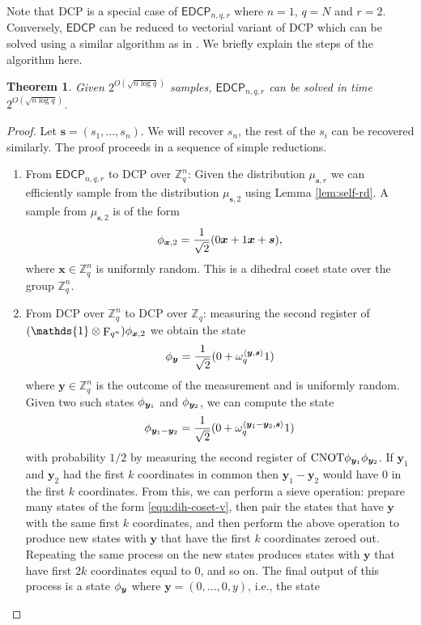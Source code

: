 \documentclass[11pt]{article}
\theoremstyle{plain}
\newtheorem{theorem}{Theorem}
\theoremstyle{definition}
\DeclareMathOperator{\qft}{F}
\let\ket\relax
\DeclarePairedDelimiter{\ket}{\lvert}{\rangle}
\DeclarePairedDelimiter{\lrang}{\langle}{\rangle}
\def\Z{\mathbb{Z}}
\def\edcp{\mathsf{EDCP}}
\begin{document}
Note that DCP is a special case of $\edcp_{n, q, r}$ where $n = 1$, $q = N$ and $r = 2$. Conversely, $\edcp$ can be reduced to vectorial variant of DCP which can be solved using a similar algorithm as in \cite{kuperberg2005subexponential}. We briefly explain the steps of the algorithm here.
\begin{theorem}
    \label{thm:subexp-smpl}
    Given $2^{O(\sqrt{n\log q})}$ samples, $\edcp_{n, q, r}$ can be solved in time $2^{O(\sqrt{n\log q})}$.
\end{theorem}
\begin{proof}
    Let $\bm{s} = (s_1, \dots, s_n)$. We will recover $s_n$, the rest of the $s_i$ can be recovered similarly. The proof proceeds in a sequence of simple reductions.
    \begin{enumerate}[leftmargin = *, font = \bfseries]
    \item From $\edcp_{n, q, r}$ to DCP over $\Z_q^n$: Given the distribution $\mu_{\bm{s}, r}$ we can efficiently sample from the distribution $\mu_{\bm{s}, 2}$ using Lemma \ref{lem:self-rd}. A sample from $\mu_{\bm{s}, 2}$ is of the form
    \[ \ket{\phi_{\bm{x}, 2}} = \frac{1}{\sqrt{2}}(\ket{0}\ket{\bm{x}} + \ket{1}\ket{\bm{x} + \bm{s}}), \]
    where $\bm{x} \in \Z_q^n$ is uniformly random. This is a dihedral coset state over the group $\Z_q^n$.
    \item From DCP over $\Z_q^n$ to DCP over $\Z_q$: measuring the second register of $(\mathds{1} \otimes \qft_{q^n}) \ket{\phi_{\bm{x}, 2}}$ we obtain the state
    \begin{equation}
        \label{equ:dih-coset-v}
        \ket{\phi_{\bm{y}}} = \frac{1}{\sqrt{2}}(\ket{0} + \omega_q^{\lrang{\bm{y}, \bm{s}}}\ket{1})
    \end{equation}
    where $\bm{y} \in \Z_q^n$ is the outcome of the measurement and is uniformly random. Given two such states $\ket{\phi_{\bm{y}_1}}$ and $\ket{\phi_{\bm{y}_2}}$, we can compute the state
    \[ \ket{\phi_{\bm{y}_1 - \bm{y}_2}} = \frac{1}{\sqrt{2}}(\ket{0} + \omega_q^{\lrang{\bm{y}_1 - \bm{y}_2, \bm{s}}}\ket{1}) \]
    with probability $1 / 2$ by measuring the second register of $\mathrm{CNOT} \ket{\phi_{\bm{y}_1}} \ket{\phi_{\bm{y}_2}}$. If $\bm{y}_1$ and $\bm{y}_2$ had the first $k$ coordinates in common then $\bm{y}_1 - \bm{y}_2$ would have $0$ in the first $k$ coordinates. From this, we can perform a sieve operation: prepare many states of the form \eqref{equ:dih-coset-v}, then pair the states that have $\bm{y}$ with the same first $k$ coordinates, and then perform the above operation to produce new states with $\bm{y}$ that have the first $k$ coordinates zeroed out. Repeating the same process on the new states produces states with $\bm{y}$ that have first $2k$ coordinates equal to $0$, and so on. The final output of this process is a state $\ket{\phi_{\bm{y}}}$ where $\bm{y} = (0, \dots, 0, y)$, i.e., the state

\end{enumerate}
\end{proof}
\end{document}
